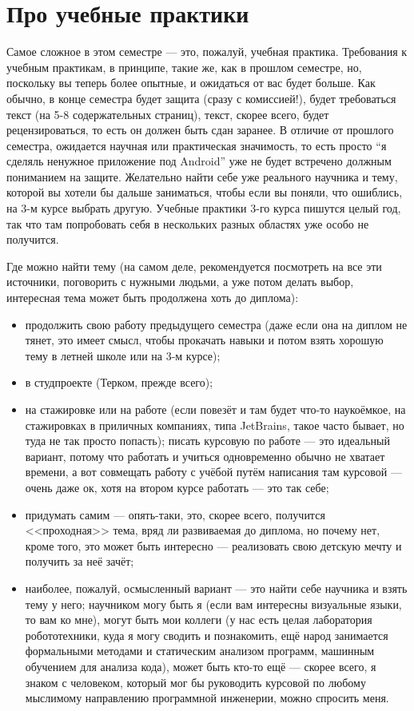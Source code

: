 \documentclass[a5paper]{article}
\begin{document}
\section{Про учебные практики}

Самое сложное в этом семестре --- это, пожалуй, учебная практика. Требования к учебным практикам, в принципе, такие же, как в прошлом семестре, но, поскольку вы теперь более опытные, и ожидаться от вас будет больше. Как обычно, в конце семестра будет защита (сразу с комиссией!), будет требоваться текст (на 5-8 содержательных страниц), текст, скорее всего, будет рецензироваться, то есть он должен быть сдан заранее. В отличие от прошлого семестра, ожидается научная или практическая значимость, то есть просто ``я сделяль ненужное приложение под Android'' уже не будет встречено должным пониманием на защите. Желательно найти себе уже реального научника и тему, которой вы хотели бы дальше заниматься, чтобы если вы поняли, что ошиблись, на 3-м курсе выбрать другую. Учебные практики 3-го курса пишутся целый год, так что там попробовать себя в нескольких разных областях уже особо не получится.

Где можно найти тему (на самом деле, рекомендуется посмотреть на все эти источники, поговорить с нужными людьми, а уже потом делать выбор, интересная тема может быть продолжена хоть до диплома):
\begin{itemize}
	\item продолжить свою работу предыдущего семестра (даже если она на диплом не тянет, это имеет смысл, чтобы прокачать навыки и потом взять хорошую тему в летней школе или на 3-м курсе);
	\item в студпроекте (Терком, прежде всего);
	\item на стажировке или на работе (если повезёт и там будет что-то наукоёмкое, на стажировках в приличных компаниях, типа JetBrains, такое часто бывает, но туда не так просто попасть); писать курсовую по работе --- это идеальный вариант, потому что работать и учиться одновременно обычно не хватает времени, а вот совмещать работу с учёбой путём написания там курсовой --- очень даже ок, хотя на втором курсе работать --- это так себе;
	\item придумать самим --- опять-таки, это, скорее всего, получится <<проходная>> тема, вряд ли развиваемая до диплома, но почему нет, кроме того, это может быть интересно --- реализовать свою детскую мечту и получить за неё зачёт;
	\item наиболее, пожалуй, осмысленный вариант --- это найти себе научника и взять тему у него; научником могу быть я (если вам интересны визуальные языки, то вам ко мне), могут быть мои коллеги (у нас есть целая лаборатория робототехники, куда я могу сводить и познакомить, ещё народ занимается формальными методами и статическим анализом программ, машинным обучением для анализа кода), может быть кто-то ещё --- скорее всего, я знаком с человеком, который мог бы руководить курсовой по любому мыслимому направлению программной инженерии, можно спросить меня.
\end{itemize}
\end{document}
